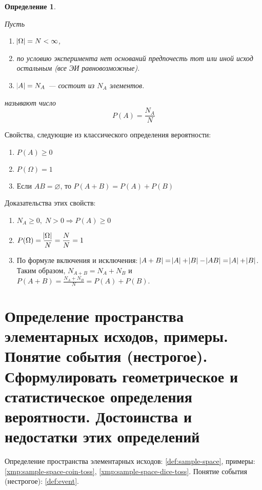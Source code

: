 \documentclass[a4paper]{report}
\theoremstyle{indented}
\newtheorem{definition}{Определение}[section]
\begin{document}
\begin{definition}
	\label{def:classical-probability}

	Пусть
	\begin{enumerate}
		\item $\abs \Omega = N < \infty$,
		\item по условию эксперимента нет оснований предпочесть тот или иной исход остальным (все ЭИ равновозможные).
		\item $\abs A = N_A$ — состоит из $N_A$ элементов.
	\end{enumerate}

	 называют число
	\begin{equation}
		\label{equ:classical-probability}
		P(A) = \frac{N_A}{N}
	\end{equation}
\end{definition}

Свойства, следующие из классического определения вероятности:
\begin{enumerate}
	\item $P(A) \geqslant 0$
	\item $P(\Omega) = 1$
	\item Если $AB = \varnothing$, то $P(A + B) = P(A) + P(B)$
\end{enumerate}

Доказательства этих свойств:
\begin{enumerate}
	\item $N_A \geqslant 0,\; N > 0 \Rightarrow P(A) \geqslant 0$
	\item $\displaystyle P(\Omega) = \frac{\abs \Omega}{N} = \frac{N}{N} = 1$
	\item По формуле включения и исключения: $\abs{A+ B} = \abs{A} + \abs{B} - \abs{AB} = \abs{A} + \abs{B}$.
	Таким образом, $N_{A+B} = N_A + N_B$ и $\displaystyle P(A + B) = \frac{N_A + N_B}{N} = P(A) + P(B)$.
\end{enumerate}

\section{Определение пространства элементарных исходов, примеры.
Понятие события (нестрогое).
Сформулировать геометрическое и статистическое определения вероятности.
Достоинства и недостатки этих определений}

Определение пространства элементарных исходов: \ref{def:sample-space}, примеры: \ref{xmp:sample-space-coin-toss}, \ref{xmp:sample-space-dice-toss}.
Понятие события (нестрогое): \ref{def:event}.
\end{document}

